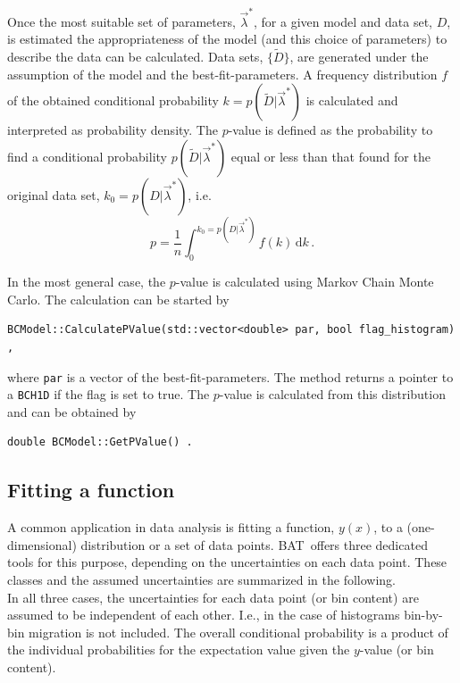 \documentclass[11pt, a4paper]{article}
\newcommand{\bat}{{\sc BAT}}
\begin{document}
Once the most suitable set of parameters, $\vec{\lambda}^{*}$, for a
given model and data set, $D$, is estimated the appropriateness of the
model (and this choice of parameters) to describe the data can be
calculated. Data sets, $\{ \tilde{D} \}$, are generated under the
assumption of the model and the best-fit-parameters. A frequency
distribution $f$ of the obtained conditional probability
$k=p(\tilde{D}|\vec{\lambda}^{*})$ is calculated and interpreted as
probability density. The $p$-value is defined as the probability to
find a conditional probability $p(\tilde{D}|\vec{\lambda}^{*})$ equal
or less than that found for the original data set,
$k_{0}=p(D|\vec{\lambda}^{*})$, i.e.
%
\begin{equation}
p = \frac{1}{n} \int_{0}^{k_{0}=p(D|\vec{\lambda}^{*})} f(k) \, \mathrm{d}k \, . 
\end{equation} 

\noindent 
In the most general case, the $p$-value is calculated using Markov
Chain Monte Carlo. The calculation can be started by 
%
\begin{verbatim}
BCModel::CalculatePValue(std::vector<double> par, bool flag_histogram) ,
\end{verbatim}
%
\noindent 
where \verb|par| is a vector of the best-fit-parameters. The method
returns a pointer to a \verb|BCH1D| if the flag is set to true. The
$p$-value is calculated from this distribution and can be obtained by
%
\begin{verbatim}
double BCModel::GetPValue() . 
\end{verbatim} 


\subsection{Fitting a function} 
\label{subsection:fitting}

A common application in data analysis is fitting a function, $y(x)$,
to a (one-dimensional) distribution or a set of data
points. \bat\ offers three dedicated tools for this purpose, depending
on the uncertainties on each data point. These classes and the assumed
uncertainties are summarized in the following. \\

\noindent 
In all three cases, the uncertainties for each data point (or bin
content) are assumed to be independent of each other. I.e., in the
case of histograms bin-by-bin migration is not included. The overall
conditional probability is a product of the individual probabilities
for the expectation value given the $y$-value (or bin content). \\
\end{document}
